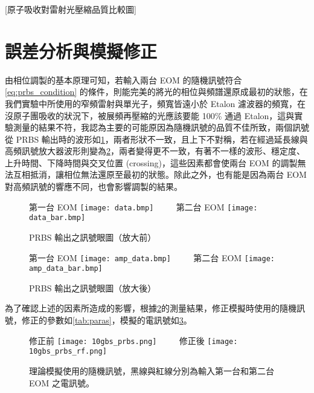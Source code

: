 \documentclass[class=NCU_thesis, crop=false]{standalone}
\begin{document}
[原子吸收對雷射光壓縮品質比較圖]

\section{誤差分析與模擬修正}

由相位調製的基本原理可知，若輸入兩台 EOM 的隨機訊號符合\cref{eq:prbs_condition} 的條件，則能完美的將光的相位與頻譜還原成最初的狀態，在我們實驗中所使用的窄頻雷射與單光子，頻寬皆遠小於 Etalon 濾波器的頻寬，在沒原子團吸收的狀況下，被展頻再壓縮的光應該要能 100\% 通過 Etalon，這與實驗測量的結果不符，我認為主要的可能原因為隨機訊號的品質不佳所致，兩個訊號從 PRBS 輸出時的波形如\cref{fig:prbs_eye_}，兩者形狀不一致，且上下不對稱，若在經過延長線與高頻訊號放大器波形則變為\cref{fig:amp_prbs_eye}，兩者變得更不一致，有著不一樣的波形、穩定度、上升時間、下降時間與交叉位置 (crossing)，這些因素都會使兩台 EOM 的調製無法互相抵消，讓相位無法還原至最初的狀態。除此之外，也有能是因為兩台 EOM 對高頻訊號的響應不同，也會影響調製的結果。

\begin{figure}[!hbt]
    \centering
    \subcaptionbox
        {第一台 EOM
        \label{fig:subfig_fig1}}
        {\texttt{[image: data.bmp]}}
    ~~~~
    \subcaptionbox
        {第二台 EOM
        \label{fig:subfig_fig2}}
        {\texttt{[image: data\_bar.bmp]}}
    \caption{PRBS 輸出之訊號眼圖（放大前）}
    \label{fig:prbs_eye_}
\end{figure}

\begin{figure}[!hbt]
    \centering
    \subcaptionbox
        {第一台 EOM
        \label{fig:subfig_fig1}}
        {\texttt{[image: amp\_data.bmp]}}
    ~~~~
    \subcaptionbox
        {第二台 EOM
        \label{fig:subfig_fig2}}
        {\texttt{[image: amp\_data\_bar.bmp]}}
    \caption{PRBS 輸出之訊號眼圖（放大後）}
    \label{fig:amp_prbs_eye}
\end{figure}

為了確認上述的因素所造成的影響，根據\cref{fig:amp_prbs_eye}的測量結果，修正模擬時使用的隨機訊號，修正的參數如\cref{tab:paras}，模擬的電訊號如\cref{fig:modify_or_not}。

\begin{figure}[!hbt]
    \centering
    \subcaptionbox
        {修正前
        \label{fig:subfig_fig1}}
        {\texttt{[image: 10gbs\_prbs.png]}}
    ~~~~
    \subcaptionbox
        {修正後
        \label{fig:subfig_fig2}}
        {\texttt{[image: 10gbs\_prbs\_rf.png]}}
    \caption{理論模擬使用的隨機訊號，黑線與紅線分別為輸入第一台和第二台 EOM 之電訊號。}
    \label{fig:modify_or_not}
\end{figure}
\end{document}
